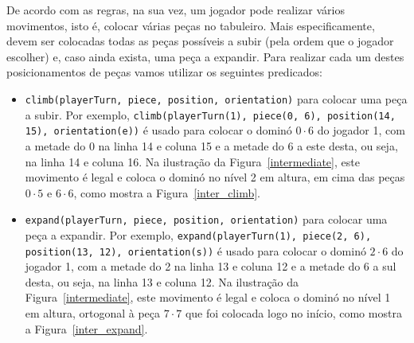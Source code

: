 \documentclass[a4paper]{article}
\begin{document}
De acordo com as regras, na sua vez, um jogador pode realizar vários movimentos, isto é, colocar várias peças no tabuleiro. Mais especificamente, devem ser colocadas todas as peças possíveis a subir (pela ordem que o jogador escolher) e, caso ainda exista, uma peça a expandir. Para realizar cada um destes posicionamentos de peças vamos utilizar os seguintes predicados:
\begin{itemize}
	\item
	\verb|climb(playerTurn, piece, position, orientation)| para colocar uma peça a subir. Por exemplo, \verb|climb(playerTurn(1), piece(0, 6), position(14, 15), orientation(e))| é usado para colocar o dominó $0 \cdot 6$ do jogador 1, com a metade do 0 na linha 14 e coluna 15 e a metade do 6 a este desta, ou seja, na linha 14 e coluna 16. Na ilustração da Figura~\ref{intermediate}, este movimento é legal e coloca o dominó no nível 2 em altura, em cima das peças $0 \cdot 5$ e $6 \cdot 6$, como mostra a Figura~\ref{inter_climb}.
	\item
	\verb|expand(playerTurn, piece, position, orientation)| para colocar uma peça a expandir. Por exemplo, \verb|expand(playerTurn(1), piece(2, 6), position(13, 12), orientation(s))| é usado para colocar o dominó $2 \cdot 6$ do jogador 1, com a metade do 2 na linha 13 e coluna 12 e a metade do 6 a sul desta, ou seja, na linha 13 e coluna 12. Na ilustração da Figura~\ref{intermediate}, este movimento é legal e coloca o dominó no nível 1 em altura, ortogonal à peça $7 \cdot 7$ que foi colocada logo no início, como mostra a Figura~\ref{inter_expand}.	
\end{itemize}

\end{document}
